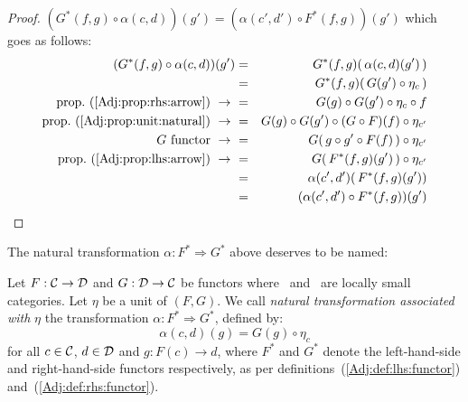 \begin{proof}
    $(G^{*}(f,g)\circ\alpha(c,d))(g')=(\alpha(c',d')\circ F^{*}(f,g))(g')$
    which goes as follows:
        \begin{eqnarray*}(G^{*}(f,g)\circ\alpha(c,d))(g')
            &=&G^{*}(f,g)(\,\alpha(c,d)(g')\,)\\
            &=&G^{*}(f,g)(\,G(g')\circ\eta_{c}\,)\\
            \mbox{prop.~(\ref{Adj:prop:rhs:arrow})}\ \to\ 
            &=&G(g)\circ G(g')\circ\eta_{c}\circ f\\
            \mbox{prop.~(\ref{Adj:prop:unit:natural})}\ \to\ 
            &=&G(g)\circ G(g')\circ (G\circ F)(f)\circ\eta_{c'}\\
            \mbox{$G$ functor}\ \to\ 
            &=&G(\,g\circ g'\circ F(f)\,)\circ\eta_{c'}\\
            \mbox{prop.~(\ref{Adj:prop:lhs:arrow})}\ \to\ 
            &=&G(\,F^{*}(f,g)(g')\,)\circ\eta_{c'}\\
            &=&\alpha(c',d')(\,F^{*}(f,g)(g'))\\
            &=&(\alpha(c',d')\circ F^{*}(f,g))(g')\\
        \end{eqnarray*}
\end{proof}

The natural transformation $\alpha:F^{*}\Rightarrow G^{*}$ above deserves to 
be named:
\begin{defin}\label{Adj:def:natural:associated:unit}
    Let $F:\mbox{$\cal C$}\to\mbox{$\cal D$}$ and $G:\mbox{$\cal D$}\to\mbox{$\cal C$}$ be functors where \Cat\ and \Dat\ 
    are locally small categories. Let $\eta$ be a unit of $(F,G)$. We call
    {\em natural transformation associated with} $\eta$ the transformation 
    $\alpha:F^{*}\Rightarrow G^{*}$, defined by:
        \[
            \alpha(c,d)(g)=G(g)\circ\eta_{c}
        \]
    for all $c\in\mbox{$\cal C$}$, $d\in\mbox{$\cal D$}$ and $g:F(c)\to d$, where $F^{*}$ and $G^{*}$ 
    denote the left-hand-side and right-hand-side functors respectively,
    as per definitions~(\ref{Adj:def:lhs:functor}) and~(\ref{Adj:def:rhs:functor}).
\end{defin}

